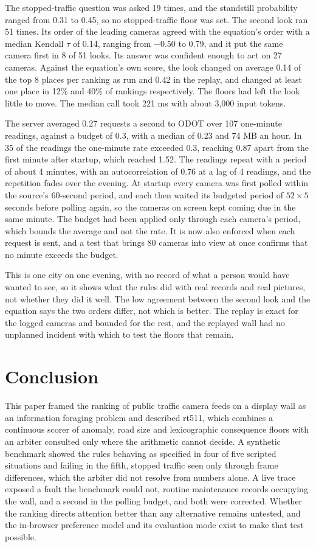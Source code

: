 \documentclass[10pt,journal,compsoc]{IEEEtran}
\begin{document}
The stopped-traffic question was asked 19 times, and the standstill probability ranged from 0.31 to 0.45, so no stopped-traffic floor was set. The second look ran 51 times. Its order of the leading cameras agreed with the equation's order with a median Kendall $\tau$ of 0.14, ranging from $-0.50$ to 0.79, and it put the same camera first in 8 of 51 looks. Its answer was confident enough to act on 27 cameras. Against the equation's own score, the look changed on average 0.14 of the top 8 places per ranking as run and 0.42 in the replay, and changed at least one place in 12\% and 40\% of rankings respectively. The floors had left the look little to move. The median call took 221 ms with about 3,000 input tokens.

The server averaged 0.27 requests a second to ODOT over 107 one-minute readings, against a budget of 0.3, with a median of 0.23 and 74 MB an hour. In 35 of the readings the one-minute rate exceeded 0.3, reaching 0.87 apart from the first minute after startup, which reached 1.52. The readings repeat with a period of about 4 minutes, with an autocorrelation of 0.76 at a lag of 4 readings, and the repetition fades over the evening. At startup every camera was first polled within the source's 60-second period, and each then waited its budgeted period of $52 \times 5$ seconds before polling again, so the cameras on screen kept coming due in the same minute. The budget had been applied only through each camera's period, which bounds the average and not the rate. It is now also enforced when each request is sent, and a test that brings 80 cameras into view at once confirms that no minute exceeds the budget.

This is one city on one evening, with no record of what a person would have wanted to see, so it shows what the rules did with real records and real pictures, not whether they did it well. The low agreement between the second look and the equation says the two orders differ, not which is better. The replay is exact for the logged cameras and bounded for the rest, and the replayed wall had no unplanned incident with which to test the floors that remain.

\section{Conclusion}
This paper framed the ranking of public traffic camera feeds on a display wall as an information foraging problem and described rt511, which combines a continuous scorer of anomaly, road size and lexicographic consequence floors with an arbiter consulted only where the arithmetic cannot decide. A synthetic benchmark showed the rules behaving as specified in four of five scripted situations and failing in the fifth, stopped traffic seen only through frame differences, which the arbiter did not resolve from numbers alone. A live trace exposed a fault the benchmark could not, routine maintenance records occupying the wall, and a second in the polling budget, and both were corrected. Whether the ranking directs attention better than any alternative remains untested, and the in-browser preference model and its evaluation mode exist to make that test possible.



\end{document}
